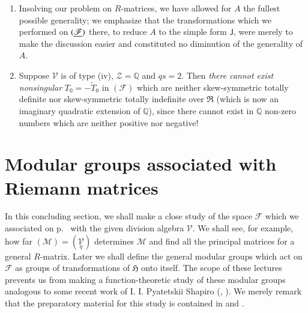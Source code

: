 \begin{remarks*}
\begin{enumerate}
\renewcommand{\labelenumi}{(\theenumi)}
\item In\pageoriginale solving our problem on $R$-matrices, we have
  allowed for $A$ the fullest possible generality; we emphasize that
  the transformations which we performed on $(\underline{\mathscr{F}})$
  there, to reduce $A$ to the simple form $\mathsf{J}$, were merely to
  make the discussion easier and constituted no diminution of the
  generality of $A$.

\item Suppose $\mathscr{V}$ is of type (iv), $\mathscr{Z}=\mathbb{Q}$
  and $qs=2$. Then {\em there cannot exist nonsingular}
  $T_{0}=-\widetilde{T}_{0}$ in $(\mathscr{F})$ which are neither
  skew-symmetric totally definite nor skew-symmetric totally
  indefinite over $\mathfrak{R}$ (which is now an imaginary quadratic
  extension of $\mathbb{Q}$), since there cannot exist in $\mathbb{Q}$
  non-zero numbers which are neither positive nor negative!
\end{enumerate}
\end{remarks*}



\section{Modular groups associated with
 Riemann matrices}\label{chap1-sec8}

In this concluding section, we shall make a close study of the space
$\mathscr{F}$ which we associated on p.~\pageref{p77} with the given division
algebra $\mathscr{V}$. We shall see, for example, how far
$(\mathscr{M})=(\underset{q}{\mathscr{V}})$ determines $\mathscr{M}$
and find all the principal matrices for a general $R$-matrix. Later we
shall define the general modular groups which act on $\mathscr{F}$ as
groups of transformations of $\mathfrak{H}$ onto itself. The scope of
these lectures prevents us from making a function-theoretic study of
these modular groups analogous to some recent work of I. I. Pyatetskii
Shapiro (\cite{13}, \cite{14}). We merely remark that the preparatory
material for this study is contained in \cite{21} and \cite{22}.

